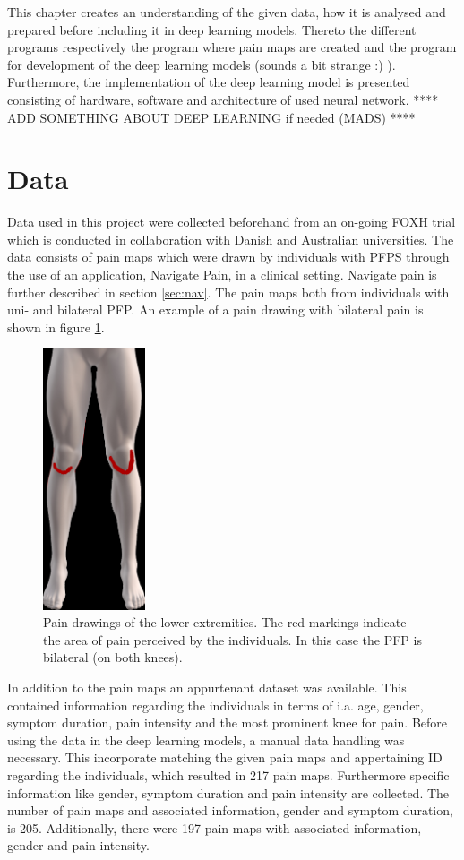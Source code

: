 This chapter creates an understanding of the given data, how it is analysed and prepared before including it in deep learning models. Thereto the different programs respectively the program where pain maps are created and the program for development of the deep learning models (sounds a bit strange :) ). Furthermore, the implementation of the deep learning model is presented consisting of hardware, software and architecture of used neural network.
 **** ADD SOMETHING ABOUT DEEP LEARNING if needed (MADS) ****

\section{Data}
Data used in this project were collected beforehand from an on-going FOXH trial which is conducted in collaboration with Danish and Australian universities. The data consists of pain maps which were drawn by individuals with PFPS through the use of an application, Navigate Pain, in a clinical setting. Navigate pain is further described in section \ref{sec:nav}. The pain maps both from individuals with uni- and bilateral PFP. An example of a pain drawing with bilateral pain is shown in figure \ref{fig:kneepainmap}.

\begin{figure} [H]
\centering
\includegraphics[width=0.27\textwidth]{figures/kneepainmap}
\caption{Pain drawings of the lower extremities. The red markings indicate the area of pain perceived by the individuals. In this case the PFP is bilateral (on both knees).}
\label{fig:kneepainmap}
\end{figure}

\noindent
In addition to the pain maps an appurtenant dataset was available. This contained information regarding the individuals in terms of i.a. age, gender, symptom duration, pain intensity and the most prominent knee for pain.
Before using the data in the deep learning models, a manual data handling was necessary. This incorporate matching the given pain maps and appertaining ID regarding the individuals, which resulted in 217 pain maps. Furthermore specific information like gender, symptom duration and pain intensity are collected. The number of pain maps and associated information, gender and symptom duration, is 205. Additionally, there were 197 pain maps with associated information, gender and pain intensity.


